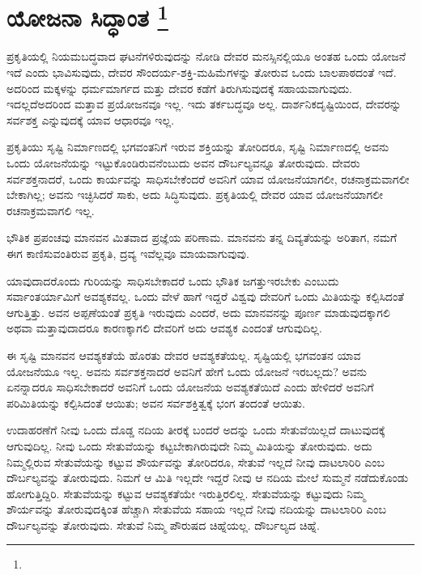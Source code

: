 
\vspace{-0.4cm}

\chapter[ಯೋಜನಾ ಸಿದ್ಧಾಂತ ]{ಯೋಜನಾ ಸಿದ್ಧಾಂತ \protect\footnote{}}

ಪ್ರಕೃತಿಯಲ್ಲಿ ನಿಯಮಬದ್ಧವಾದ ಘಟನೆಗಳಿರುವುದನ್ನು ನೋಡಿ ದೇವರ ಮನಸ್ಸಿನಲ್ಲಿಯೂ ಅಂತಹ ಒಂದು ಯೋಜನೆ ಇದೆ ಎಂದು ಭಾವಿಸುವುದು, ದೇವರ ಸೌಂದರ್ಯ-ಶಕ್ತಿ-ಮಹಿಮೆಗಳನ್ನು ತೋರುವ ಒಂದು ಬಾಲಪಾಠದಂತೆ ಇದೆ. ಅದರಿಂದ ಮಕ್ಕಳನ್ನು ಧರ್ಮಮಾರ್ಗದ ಮತ್ತು ದೇವರ ಕಡೆಗೆ ತಿರುಗಿಸುವುದಕ್ಕೆ ಸಹಾಯವಾಗುವುದು. ಇದಲ್ಲದೆ\break ಅದರಿಂದ ಮತ್ತಾವ ಪ್ರಯೋಜನವೂ ಇಲ್ಲ. ಇದು ತರ್ಕಬದ್ಧವೂ ಅಲ್ಲ. ದಾರ್ಶನಿಕ\break ದೃಷ್ಟಿಯಿಂದ, ದೇವರನ್ನು ಸರ್ವಶಕ್ತ ಎನ್ನುವುದಕ್ಕೆ ಯಾವ ಆಧಾರವೂ ಇಲ್ಲ.

\vskip 6pt

ಪ್ರಕೃತಿಯು ಸೃಷ್ಟಿ ನಿರ್ಮಾಣದಲ್ಲಿ ಭಗವಂತನಿಗೆ ಇರುವ ಶಕ್ತಿಯನ್ನು ತೋರಿದರೂ, ಸೃಷ್ಟಿ ನಿರ್ಮಾಣದಲ್ಲಿ ಅವನು ಒಂದು ಯೋಜನೆಯನ್ನು ಇಟ್ಟುಕೊಂಡಿರುವನೆಂಬುದು ಅವನ ದೌರ್ಬಲ್ಯವನ್ನೂ ತೋರುವುದು. ದೇವರು ಸರ್ವಶಕ್ತನಾದರೆ, ಒಂದು ಕಾರ್ಯವನ್ನು ಸಾಧಿಸಬೇಕೆಂದರೆ ಅವನಿಗೆ ಯಾವ ಯೋಜನೆಯಾಗಲೀ, ರಚನಾಕ್ರಮವಾಗಲೀ ಬೇಕಾಗಿಲ್ಲ; ಅವನು ಇಚ್ಛಿಸಿದರೆ ಸಾಕು, ಅದು ಸಿದ್ಧಿಸುವುದು. ಪ್ರಕೃತಿಯಲ್ಲಿ ದೇವರ ಯಾವ ಯೋಜನೆಯಾಗಲೀ ರಚನಾಕ್ರಮವಾಗಲಿ ಇಲ್ಲ.

\vskip 6pt

ಭೌತಿಕ ಪ್ರಪಂಚವು ಮಾನವನ ಮಿತವಾದ ಪ್ರಜ್ಞೆಯ ಪರಿಣಾಮ. ಮಾನವನು ತನ್ನ ದಿವ್ಯತೆಯನ್ನು ಅರಿತಾಗ, ನಮಗೆ ಈಗ ಕಾಣಿಸುವಂತಿರುವ ಪ್ರಕೃತಿ, ದ್ರವ್ಯ ಇವೆಲ್ಲವೂ ಮಾಯವಾಗುವುವು.

\vskip 5pt

ಯಾವುದಾದರೊಂದು ಗುರಿಯನ್ನು ಸಾಧಿಸಬೇಕಾದರೆ ಒಂದು ಭೌತಿಕ ಜಗತ್ತು\break ಇರಬೇಕು ಎಂಬುದು ಸರ್ವಾಂತರ್ಯಾಮಿಗೆ ಅವಶ್ಯಕವಲ್ಲ. ಒಂದು ವೇಳೆ ಹಾಗೆ ಇದ್ದರೆ ವಿಶ್ವವು ದೇವರಿಗೆ ಒಂದು ಮಿತಿಯನ್ನು ಕಲ್ಪಿಸಿದಂತೆ ಆಗುತ್ತಿತ್ತು. ಅವನ ಅಪ್ಪಣೆಯಂತೆ ಪ್ರಕೃತಿ ಇರುವುದು ಎಂದರೆ, ಅದು ಮಾನವನನ್ನು ಪೂರ್ಣ ಮಾಡುವುದಕ್ಕಾಗಲಿ ಅಥವಾ ಮತ್ತಾವುದಾದರೂ ಕಾರಣಕ್ಕಾಗಲಿ ದೇವರಿಗೆ ಅದು ಆವಶ್ಯಕ ಎಂದಂತೆ ಆಗುವುದಿಲ್ಲ.

\vskip 5pt

ಈ ಸೃಷ್ಟಿ ಮಾನವನ ಆವಶ್ಯಕತೆಯೆ ಹೊರತು ದೇವರ ಆವಶ್ಯಕತೆಯಲ್ಲ. ಸೃಷ್ಟಿಯಲ್ಲಿ ಭಗವಂತನ ಯಾವ ಯೋಜನೆಯೂ ಇಲ್ಲ. ಅವನು ಸರ್ವಶಕ್ತನಾದರೆ ಅವನಿಗೆ ಹೇಗೆ ಒಂದು ಯೋಜನೆ ಇರಬಲ್ಲದು? ಅವನು ಏನನ್ನಾದರೂ ಸಾಧಿಸಬೇಕಾದರೆ ಅವನಿಗೆ ಒಂದು ಯೋಜನೆಯ ಅವಶ್ಯಕತೆಯಿದೆ ಎಂದು ಹೇಳಿದರೆ ಅವನಿಗೆ ಪರಿಮಿತಿಯನ್ನು ಕಲ್ಪಿಸಿದಂತೆ ಆಯಿತು; ಅವನ ಸರ್ವಶಕ್ತಿತ್ವಕ್ಕೆ ಭಂಗ ತಂದಂತೆ ಆಯಿತು.

\vskip 5pt

ಉದಾಹರಣೆಗೆ ನೀವು ಒಂದು ದೊಡ್ಡ ನದಿಯ ತೀರಕ್ಕೆ ಬಂದರೆ ಅದನ್ನು ಒಂದು ಸೇತುವೆಯಿಲ್ಲದೆ ದಾಟುವುದಕ್ಕೆ ಆಗುವುದಿಲ್ಲ. ನೀವು ಒಂದು ಸೇತುವೆಯನ್ನು ಕಟ್ಟಬೇಕಾಗಿರುವುದೇ ನಿಮ್ಮ ಮಿತಿಯನ್ನು ತೋರುವುದು. ಅದು ನಿಮ್ಮಲ್ಲಿರುವ ಸೇತುವೆಯನ್ನು ಕಟ್ಟುವ ಶೌರ್ಯವನ್ನು ತೋರಿದರೂ, ಸೇತುವೆ ಇಲ್ಲದೆ ನೀವು ದಾಟಲಾರಿರಿ ಎಂಬ ದೌರ್ಬಲ್ಯವನ್ನು ತೋರುವುದು. ನಿಮಗೆ ಆ ಮಿತಿ ಇಲ್ಲದೇ ಇದ್ದರೆ ನೀವು ಆ ನದಿಯ ಮೇಲೆ ಸುಮ್ಮನೆ ನಡೆದುಕೊಂಡು ಹೋಗುತ್ತಿದ್ದಿರಿ. ಸೇತುವೆಯನ್ನು ಕಟ್ಟುವ ಆವಶ್ಯಕತೆಯೇ ಇರುತ್ತಿರಲಿಲ್ಲ. ಸೇತುವೆಯನ್ನು ಕಟ್ಟುವುದು ನಿಮ್ಮ ಶೌರ್ಯವನ್ನು ತೋರುವುದಕ್ಕಿಂತ ಹೆಚ್ಚಾಗಿ ಸೇತುವೆಯ ಸಹಾಯ ಇಲ್ಲದೆ ನೀವು ನದಿಯನ್ನು ದಾಟಲಾರಿರಿ ಎಂಬ ದೌರ್ಬಲ್ಯವನ್ನು ತೋರುವುದು. ಸೇತುವೆ ನಿಮ್ಮ ಪೌರುಷದ ಚಿಹ್ನೆಯಲ್ಲ. ದೌರ್ಬಲ್ಯದ ಚಿಹ್ನೆ.

